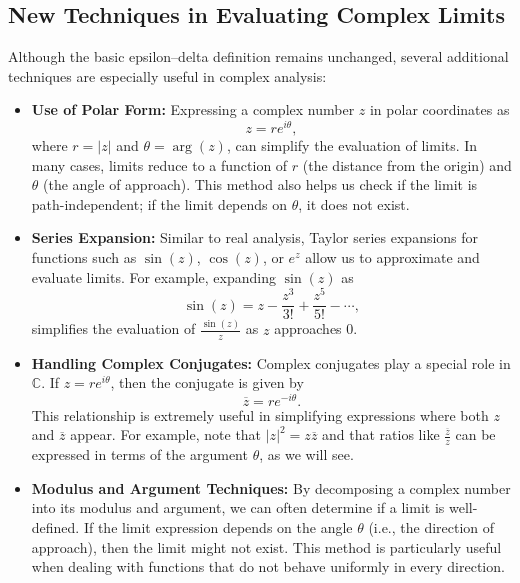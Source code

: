 \subsection*{New Techniques in Evaluating Complex Limits}

\noindent Although the basic epsilon–delta definition remains unchanged, several additional techniques are especially useful in complex analysis:

\begin{itemize}
    \item \textbf{Use of Polar Form:} Expressing a complex number \(z\) in polar coordinates as
    \[
    z = re^{i\theta},
    \]
    where \(r = |z|\) and \(\theta = \arg(z)\), can simplify the evaluation of limits. In many cases, limits reduce to a function of \(r\) (the distance from the origin) and \(\theta\) (the angle of approach). This method also helps us check if the limit is path-independent; if the limit depends on \(\theta\), it does not exist.
    
    \item \textbf{Series Expansion:} Similar to real analysis, Taylor series expansions for functions such as \(\sin(z)\), \(\cos(z)\), or \(e^z\) allow us to approximate and evaluate limits. For example, expanding \(\sin(z)\) as
    \[
    \sin(z) = z - \frac{z^3}{3!} + \frac{z^5}{5!} - \cdots,
    \]
    simplifies the evaluation of \(\frac{\sin(z)}{z}\) as \(z\) approaches 0.
    
    \item \textbf{Handling Complex Conjugates:} Complex conjugates play a special role in \(\mathbb{C}\). If \(z = re^{i\theta}\), then the conjugate is given by
    \[
    \overline{z} = re^{-i\theta}.
    \]
    This relationship is extremely useful in simplifying expressions where both \(z\) and \(\overline{z}\) appear. For example, note that \(|z|^2 = z\overline{z}\) and that ratios like \(\frac{\overline{z}}{z}\) can be expressed in terms of the argument \(\theta\), as we will see.
    
    \item \textbf{Modulus and Argument Techniques:} By decomposing a complex number into its modulus and argument, we can often determine if a limit is well-defined. If the limit expression depends on the angle \(\theta\) (i.e., the direction of approach), then the limit might not exist. This method is particularly useful when dealing with functions that do not behave uniformly in every direction.
\end{itemize}

